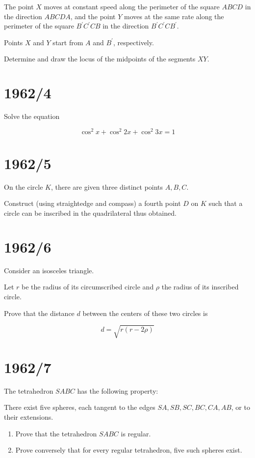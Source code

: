 \documentclass[12pt]{article}
\begin{document}
The point \( X \) moves at constant speed along the perimeter of the square \( ABCD \) in the direction \( ABCDA \), and the point \( Y \) moves at the same rate along the perimeter of the square \( B^{\prime}C^{\prime}CB \) in the direction \( B^{\prime}C^{\prime}CB^{\prime} \).

Points \( X \) and \( Y \) start from \( A \) and \( B^{\prime} \), respectively.

Determine and draw the locus of the midpoints of the segments \( XY \).

\section*{1962/4}

Solve the equation

\[
\cos^2 x + \cos^2 2x + \cos^2 3x = 1
\]

\section*{1962/5}

On the circle \( K \), there are given three distinct points \( A, B, C \).

Construct (using straightedge and compass) a fourth point \( D \) on \( K \) such that a circle can be inscribed in the quadrilateral thus obtained.

\section*{1962/6}

Consider an isosceles triangle.

Let \( r \) be the radius of its circumscribed circle and \( \rho \) the radius of its inscribed circle.

Prove that the distance \( d \) between the centers of these two circles is

\[
d = \sqrt{r(r-2\rho)}
\]

\section*{1962/7}

The tetrahedron \( SABC \) has the following property:

There exist five spheres, each tangent to the edges \( SA, SB, SC, BC, CA, AB \), or to their extensions.

\begin{enumerate}
    \item Prove that the tetrahedron \( SABC \) is regular.
    
    \item Prove conversely that for every regular tetrahedron, five such spheres exist.
\end{enumerate}
\end{document}
